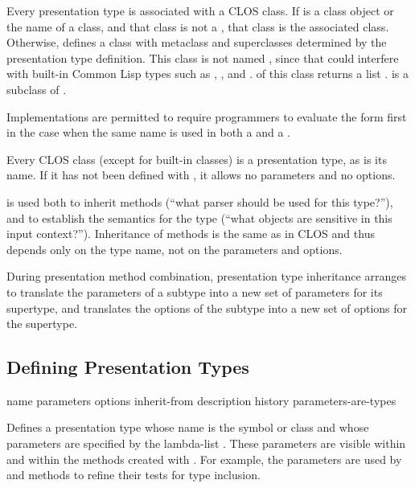 Every presentation type is associated with a CLOS class.  If  is a
class object or the name of a class, and that class is not a
, that class is the associated class.  Otherwise,
 defines a class with metaclass
 and superclasses determined by the presentation
type definition.  This class is not named , since that could interfere
with built-in Common Lisp types such as , , and .
 of this class returns a list .
 is a subclass of .

Implementations are permitted to require programmers to evaluate the
 form first in the case when the same name is used in both a
 and a .

Every CLOS class (except for built-in classes) is a presentation type, as is its
name.  If it has not been defined with , it allows
no parameters and no options.

 is used both to inherit methods (``what
parser should be used for this type?''), and to establish the semantics for the
type (``what objects are sensitive in this input context?'').  Inheritance of
methods is the same as in CLOS and thus depends only on the type name, not on
the parameters and options.

During presentation method combination, presentation type inheritance arranges
to translate the parameters of a subtype into a new set of parameters for its
supertype, and translates the options of the subtype into a new set of options
for the supertype.


\subsection {Defining Presentation Types}

 {name parameters
                                      \key options inherit-from description history
                                           parameters-are-types}

Defines a presentation type whose name is the symbol or class  and
whose parameters are specified by the lambda-list .  These
parameters are visible within  and within the methods created
with .  For example, the parameters are used by
 and  methods to refine their
tests for type inclusion.

